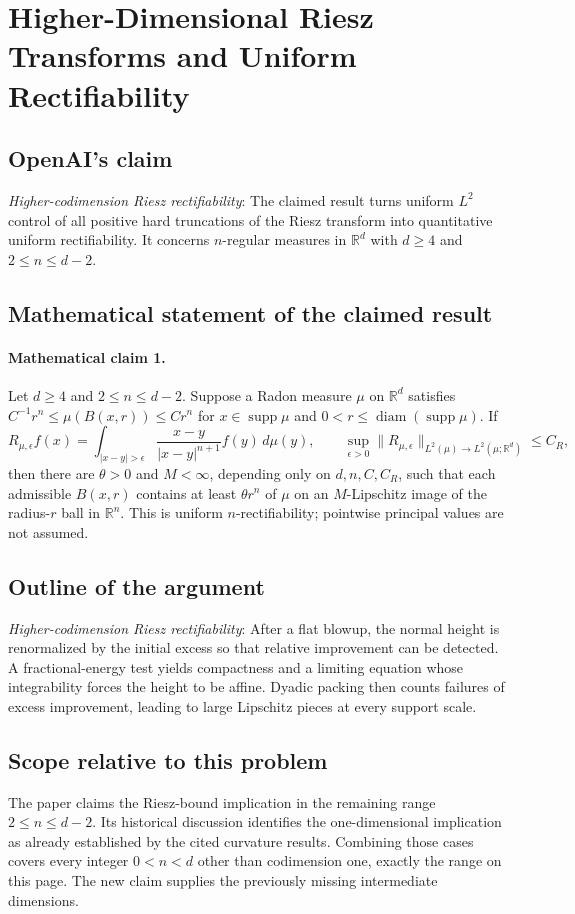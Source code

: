 \documentclass[11pt]{article}
\begin{document}
\section*{Higher-Dimensional Riesz Transforms and Uniform Rectifiability}

\subsection{OpenAI's claim}
\textit{Higher-codimension Riesz rectifiability}: The claimed result turns uniform $L^2$ control of all positive hard truncations of the Riesz transform into quantitative uniform rectifiability. It concerns $n$-regular measures in $\mathbb R^d$ with $d\ge4$ and $2\le n\le d-2$.

\subsection{Mathematical statement of the claimed result}
\paragraph{Mathematical claim 1.} Let $d\ge4$ and $2\le n\le d-2$. Suppose a Radon measure $\mu$ on $\mathbb R^d$ satisfies $C^{-1}r^n\le\mu(B(x,r))\le Cr^n$ for $x\in\operatorname{supp}\mu$ and $0<r\le\operatorname{diam}(\operatorname{supp}\mu)$. If \[R_{\mu,\epsilon}f(x)=\int_{|x-y|>\epsilon}\frac{x-y}{|x-y|^{n+1}}f(y)\,d\mu(y),\qquad\sup_{\epsilon>0}\|R_{\mu,\epsilon}\|_{L^2(\mu)\to L^2(\mu;\mathbb R^d)}\le C_R,\] then there are $\theta>0$ and $M<\infty$, depending only on $d,n,C,C_R$, such that each admissible $B(x,r)$ contains at least $\theta r^n$ of $\mu$ on an $M$-Lipschitz image of the radius-$r$ ball in $\mathbb R^n$. This is uniform $n$-rectifiability; pointwise principal values are not assumed.

\subsection{Outline of the argument}
\textit{Higher-codimension Riesz rectifiability}: After a flat blowup, the normal height is renormalized by the initial excess so that relative improvement can be detected. A fractional-energy test yields compactness and a limiting equation whose integrability forces the height to be affine. Dyadic packing then counts failures of excess improvement, leading to large Lipschitz pieces at every support scale.

\subsection{Scope relative to this problem}
The paper claims the Riesz-bound implication in the remaining range $2\le n\le d-2$. Its historical discussion identifies the one-dimensional implication as already established by the cited curvature results. Combining those cases covers every integer $0<n<d$ other than codimension one, exactly the range on this page. The new claim supplies the previously missing intermediate dimensions.
\end{document}
